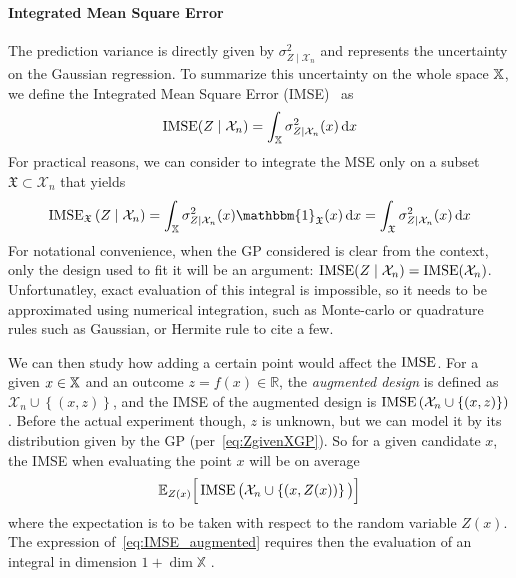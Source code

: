 \documentclass[../../Main_ManuscritThese.tex]{subfiles}
\begin{document}
\paragraph{Integrated Mean Square Error}
The prediction variance is directly given by
$\sigma^2_{Z\mid \mathcal{X}_n}$ and represents the uncertainty on the
Gaussian regression. To summarize this uncertainty on the whole space
$\mathbb{X}$, we define the Integrated Mean Square Error
(IMSE)~\citep{sacks_designs_1989} as
\begin{equation}
  \operatorname{\mathrm{IMSE}}(Z \mid \mathcal{X}_n) = \int_{\mathbb{X}} \sigma_{Z\mid\mathcal{X}_n}^2(x)\,\mathrm{d}x
\end{equation}
For practical reasons, we can consider to integrate the MSE only on a
subset $\mathfrak{X}\subset \mathcal{X}_n$ that yields
\begin{equation}
  \IMSE_{\mathfrak{X}}\left(Z \mid \mathcal{X}_n \right) = \int_{\Xspace} \sigma^2_{Z\mid \mathcal{X}_n}(x)  \mathbbm{1}_{\mathfrak{X}}(x)\,\mathrm{d}x = \int_{\mathfrak{X}} \sigma^2_{Z\mid \mathcal{X}_n}(x)\,\mathrm{d}x
\end{equation}
For notational convenience, when the GP considered is clear from the
context, only the design used to fit it will be an argument:
$\operatorname{\mathrm{IMSE}}(Z \mid \mathcal{X}_n) = \operatorname{\mathrm{IMSE}}(\mathcal{X}_n)$.  Unfortunatley, 
exact evaluation of this integral is impossible, so it needs to be
approximated using numerical integration, such as Monte-carlo or
quadrature rules such as Gaussian, or Hermite rule to cite a
few.%

We can then study how adding a certain point would affect the
$\operatorname{\mathrm{IMSE}}$. For a given $x\in \mathbb{X}$ and an outcome
$z=f(x)\in \mathbb{R}$, the \emph{augmented design} is defined as
$\mathcal{X}_n \cup \left\{(x, z)\right\}$, and the IMSE of the
augmented design is
$\operatorname{\mathrm{IMSE}}\left(\mathcal{X}_n \cup \left\{(x, z)\right\} \right)$.  Before
the actual experiment though, $z$ is unknown, but we can model it by
its distribution given by the GP (per~\cref{eq:ZgivenXGP}). So for a
given candidate $x$, the IMSE when evaluating the point $x$ will be on
average
\begin{equation}
  \label{eq:IMSE_augmented}
  \mathbb{E}_{Z(x)}\Big[\operatorname{\mathrm{IMSE}}\big(\mathcal{X}_n \cup \left\{(x, Z(x))\right\} \big)\Big]
\end{equation}
where the expectation is to be taken with respect to the random
variable $Z(x)$. The expression of~\cref{eq:IMSE_augmented} requires then the evaluation of an integral in dimension $1+\dim \mathbb{X}$ .
\end{document}

